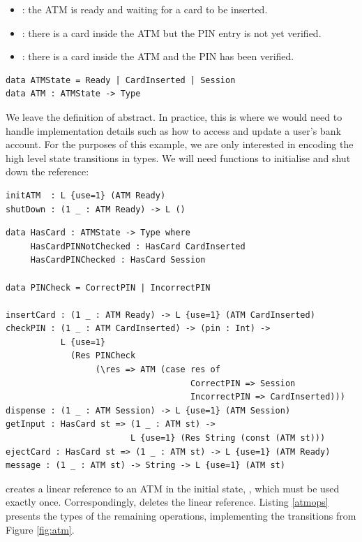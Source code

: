 \begin{itemize}
\item {}: the ATM is ready and waiting for a card to be inserted.
\item {}: there is a card inside the ATM but the PIN entry
is not yet verified.
\item {}: there is a card inside the ATM and the PIN has been
verified.
\end{itemize}

\begin{lstlisting}
data ATMState = Ready | CardInserted | Session
data ATM : ATMState -> Type
\end{lstlisting}

We leave the definition of  abstract. In practice, this is where we
would need to handle implementation details such as how to access and update a
user's bank account. For the purposes of this example, we are only interested
in encoding the high level state transitions in types.
%
We will need functions to initialise and shut down the reference:

\begin{lstlisting}
initATM  : L {use=1} (ATM Ready)
shutDown : (1 _ : ATM Ready) -> L ()
\end{lstlisting}

\begin{lstlisting}[caption={Operations on an ATM},label=atmops,float=h]
data HasCard : ATMState -> Type where
     HasCardPINNotChecked : HasCard CardInserted
     HasCardPINChecked : HasCard Session

data PINCheck = CorrectPIN | IncorrectPIN

insertCard : (1 _ : ATM Ready) -> L {use=1} (ATM CardInserted)
checkPIN : (1 _ : ATM CardInserted) -> (pin : Int) ->
           L {use=1}
             (Res PINCheck 
                  (\res => ATM (case res of
                                     CorrectPIN => Session
                                     IncorrectPIN => CardInserted)))
dispense : (1 _ : ATM Session) -> L {use=1} (ATM Session)
getInput : HasCard st => (1 _ : ATM st) ->
                         L {use=1} (Res String (const (ATM st)))
ejectCard : HasCard st => (1 _ : ATM st) -> L {use=1} (ATM Ready)
message : (1 _ : ATM st) -> String -> L {use=1} (ATM st)
\end{lstlisting}

 creates a linear reference to an ATM in the initial state,
, which must be used exactly once. Correspondingly,
 deletes the linear reference.
Listing \ref{atmops} presents the types of the remaining operations, 
implementing the transitions from Figure \ref{fig:atm}.

